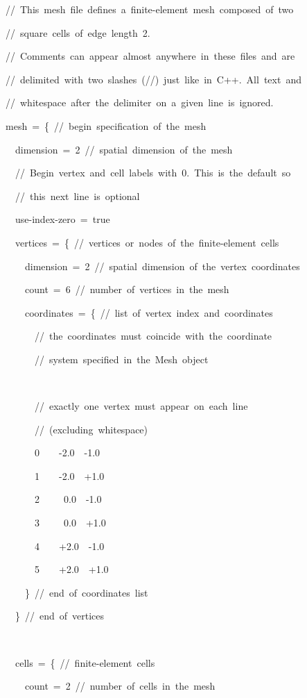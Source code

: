\begin{lyxcode}
//~This~mesh~file~defines~a~finite-element~mesh~composed~of~two

//~square~cells~of~edge~length~2.



//~Comments~can~appear~almost~anywhere~in~these~files~and~are

//~delimited~with~two~slashes~(//)~just~like~in~C++.~All~text~and~

//~whitespace~after~the~delimiter~on~a~given~line~is~ignored.

mesh~=~\{~//~begin~specification~of~the~mesh

~~dimension~=~2~//~spatial~dimension~of~the~mesh



~~//~Begin~vertex~and~cell~labels~with~0.~This~is~the~default~so~

~~//~this~next~line~is~optional

~~use-index-zero~=~true



~~vertices~=~\{~//~vertices~or~nodes~of~the~finite-element~cells

~~~~dimension~=~2~//~spatial~dimension~of~the~vertex~coordinates

~~~~count~=~6~//~number~of~vertices~in~the~mesh

~~~~coordinates~=~\{~//~list~of~vertex~index~and~coordinates

~~~~~~//~the~coordinates~must~coincide~with~the~coordinate~

~~~~~~//~system~specified~in~the~Mesh~object

~

~~~~~~//~exactly~one~vertex~must~appear~on~each~line

~~~~~~//~(excluding~whitespace)

~~~~~~0~~~~-2.0~~-1.0

~~~~~~1~~~~-2.0~~+1.0

~~~~~~2~~~~~0.0~~-1.0

~~~~~~3~~~~~0.0~~+1.0

~~~~~~4~~~~+2.0~~-1.0

~~~~~~5~~~~+2.0~~+1.0

~~~~\}~//~end~of~coordinates~list

~~\}~//~end~of~vertices

~

~~cells~=~\{~//~finite-element~cells

~~~~count~=~2~//~number~of~cells~in~the~mesh


\end{lyxcode}
